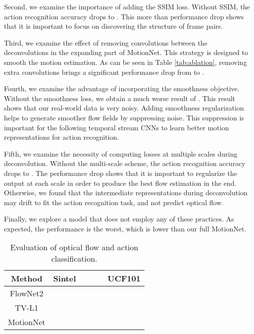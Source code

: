 \documentclass[runningheads]{llncs}
\begin{document}
		Second, we examine the importance of adding the SSIM loss. Without SSIM, the action recognition accuracy drops to . This more than  performance drop shows that it is important to focus on discovering the structure of frame pairs. 


		Third, we examine the effect of removing convolutions between the deconvolutions in the expanding part of MotionNet. This strategy is designed to smooth the motion estimation. As can be seen in Table \ref{tab:ablation}, removing extra convolutions brings a significant performance drop from  to .
		
		Fourth, we examine the advantage of incorporating the smoothness objective. Without the smoothness loss, we obtain a much worse result of . This result shows that our real-world data is very noisy.  Adding smoothness regularization helps to generate smoother flow fields by suppressing noise. This suppression is important for the following temporal stream CNNs to learn better motion representations for action recognition. 
		
		{ \color{black} Fifth, we examine the necessity of computing losses at multiple scales during deconvolution. Without the multi-scale scheme, the action recognition accuracy drops to . The performance drop shows that it is important to regularize the output at each scale in order to produce the best flow estimation in the end. Otherwise, we found that the intermediate representations during deconvolution may drift to fit the action recognition task, and not predict optical flow. }
		
		Finally, we explore a model that does not employ any of these practices. As expected, the performance is the worst, which is  lower than our full MotionNet. 
		
		\begin{table}[t]
			\begin{center}\caption{Evaluation of optical flow and action classification. \color{black}{For flow evaluation, lower error is better. For action recognition, higher accuracy is better.} \label{tab:learned_flow_quality}}
\begin{tabular}{  c | c | c | c | c || c }
						\hline
						Method	    	&   Sintel  &  \color{black}{KITTI2012}  &  \color{black}{KITTI2015}  &  \color{black}{Middlebury}  & UCF101 \\
						\hline
						\hline
						FlowNet2			&     	&   \color{black}{}  	&   \color{black}{}  	&   \color{black}{}  	 									&     \\
						TV-L1 					&      					&   \color{black}{} 					&   \color{black}{}   							&   \color{black}{}  					&     \\
						MotionNet			&     					&  \color{black} {}  					&   \color{black}{}  							&   \color{black}{ } 								&     \\
						\hline
					\end{tabular}
\end{center}
		\end{table} 
		
\end{document}
